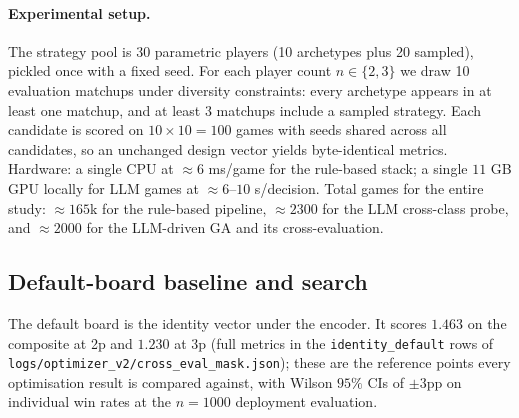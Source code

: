 \documentclass[10pt]{article}
\begin{document}
\paragraph{Experimental setup.} The strategy pool is 30 parametric
players (10 archetypes plus 20 sampled), pickled once with a fixed
seed. For each player count $n\in\{2,3\}$ we draw 10 evaluation
matchups under diversity constraints: every archetype appears in at
least one matchup, and at least 3 matchups include a sampled
strategy. Each candidate is scored on $10\times 10 = 100$ games with
seeds shared across all candidates, so an unchanged design vector
yields byte-identical metrics. Hardware: a single CPU at
$\approx 6$ ms/game for the rule-based stack; a single $11$ GB GPU
locally for LLM games at
$\approx 6$--$10$ s/decision. Total games for the entire study:
$\approx 165$k for the rule-based pipeline, $\approx 2300$ for the
LLM cross-class probe, and $\approx 2000$ for the LLM-driven GA and
its cross-evaluation.

\subsection{Default-board baseline and search}\label{sec:baseline}

The default board is the identity vector under the encoder. It
scores $1.463$ on the composite at 2p and $1.230$ at 3p (full
metrics in the \texttt{identity\_default} rows of
\texttt{logs/optimizer\_v2/cross\_eval\_mask.json}); these are the
reference points every optimisation result is compared against,
with Wilson $95\%$ CIs of $\pm 3$pp on individual win rates at the
$n{=}1000$ deployment evaluation.
\end{document}
